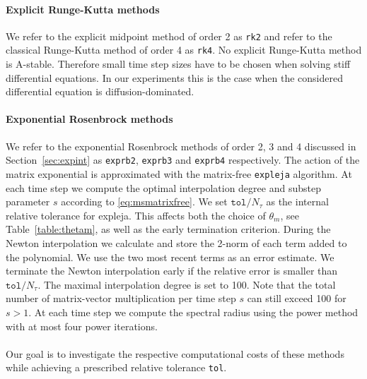 \documentclass{scrartcl}
\begin{document}
	\paragraph{Explicit Runge-Kutta methods}
	We refer to the explicit midpoint method of order 2 as \texttt{rk2} and refer to the classical Runge-Kutta method of order 4 as \texttt{rk4}. No explicit Runge-Kutta method is A-stable. Therefore small time step sizes have to be chosen when solving stiff differential equations. In our experiments this is the case when the considered differential equation is diffusion-dominated.
	
	\paragraph{Exponential Rosenbrock methods}
	We refer to the exponential Rosenbrock methods of order 2, 3 and 4 discussed in Section~\ref{sec:expint} as \texttt{exprb2}, \texttt{exprb3} and \texttt{exprb4} respectively.
	The action of the matrix exponential is approximated with the matrix-free \texttt{expleja} algorithm. At each time step we compute the optimal interpolation degree and substep parameter $s$ according to \eqref{eq:msmatrixfree}. We set $\texttt{tol}/N_\tau$ as the internal relative tolerance for expleja. This affects both the choice of $\theta_m$, see Table~\ref{table:thetam}, as well as the early termination criterion. During the Newton interpolation we calculate and store the 2-norm of each term added to the polynomial. We use the two most recent terms as an error estimate. We terminate the Newton interpolation early if the relative error is smaller than $\texttt{tol}/N_\tau$.
	The maximal interpolation degree is set to 100. Note that the total number of matrix-vector multiplication per time step $s$ can still exceed 100 for $s>1$. At each time step we compute the spectral radius using the power method with at most four power iterations.\\
	\\
	Our goal is to investigate the respective computational costs of these methods while achieving a prescribed relative tolerance \texttt{tol}.
	
\end{document}
